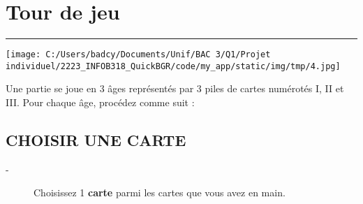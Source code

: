\documentclass{scrartcl}%
\begin{document}
%
\section{ Tour de jeu
}%
\label{sec:Tourdejeu}%
\rule{18cm}{0.07cm}\break%
%
\begin{center}\texttt{[image: C:/Users/badcy/Documents/Unif/BAC 3/Q1/Projet individuel/2223\_INFOB318\_QuickBGR/code/my\_app/static/img/tmp/4.jpg]}\end{center}%

%
Une partie se joue en 3 âges représentés par 3 piles de cartes numérotés I, II et III. Pour chaque âge, procédez comme suit :


%
\subsection{ CHOISIR UNE CARTE
}%
\label{subsec:CHOISIRUNECARTE}%
\begin{description}%
\item[{-} ]%
%
 Choisissez 1 %
\textbf{carte}%
\textit{ }%
 parmi les cartes que vous avez en main.
%
\end{description}

%
\end{document}
